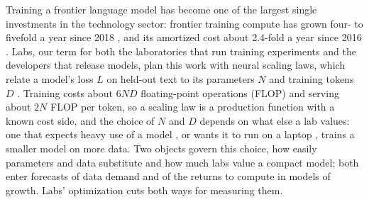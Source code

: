 
Training a frontier language model has become one of the largest single investments in the technology sector: frontier
training compute has grown four- to fivefold a year since 2018 \citep{sevilla2024training}, and its amortized cost
about 2.4-fold a year since 2016 \citep{cottier2024rising}. Labs, our term for both the laboratories that run training
experiments and the developers that release models, plan this work with neural scaling laws, which relate a model's
loss $L$ on held-out text to its parameters $N$ and training tokens $D$ \citep{kaplan2020scaling,
hoffmann2022training}. Training costs about $6ND$ floating-point operations (FLOP) and serving about $2N$ FLOP per
token, so a scaling law is a production function with a known cost side, and the choice of $N$ and $D$ depends on what
else a lab values: one that expects heavy use of a model \citep{sardana2024beyond}, or wants it to run on a laptop
\citep{benallal2025smollm2}, trains a smaller model on more data. Two objects govern this choice, how easily
parameters and data substitute and how much labs value a compact model; both enter forecasts of data demand and of the
returns to compute in models of growth. Labs' optimization cuts both ways for measuring them.

